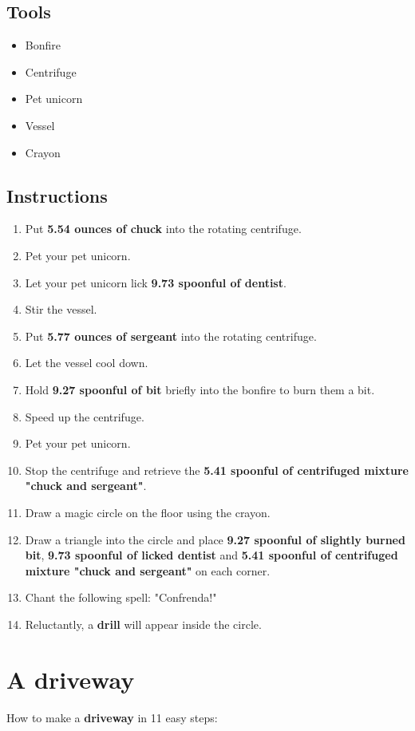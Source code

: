 \documentclass{article}
\begin{document}
\subsection{Tools}\begin{itemize}
\item 
Bonfire
\item 
Centrifuge
\item 
Pet unicorn
\item 
Vessel
\item 
Crayon
\end{itemize}
\subsection{Instructions}\begin{enumerate}
\item 
Put \textbf{5.54 ounces of chuck} into the rotating centrifuge.
\item 
Pet your pet unicorn.
\item 
Let your pet unicorn lick \textbf{9.73 spoonful of dentist}.
\item 
Stir the vessel.
\item 
Put \textbf{5.77 ounces of sergeant} into the rotating centrifuge.
\item 
Let the vessel cool down.
\item 
Hold \textbf{9.27 spoonful of bit} briefly into the bonfire to burn them a bit.
\item 
Speed up the centrifuge.
\item 
Pet your pet unicorn.
\item 
Stop the centrifuge and retrieve the \textbf{5.41 spoonful of centrifuged mixture "chuck and sergeant"}.
\item 
Draw a magic circle on the floor using the crayon.
\item 
Draw a triangle into the circle and place \textbf{9.27 spoonful of slightly burned bit}, \textbf{9.73 spoonful of licked dentist} and \textbf{5.41 spoonful of centrifuged mixture "chuck and sergeant"} on each corner.
\item 
Chant the following spell: "Confrenda!"
\item 
Reluctantly, a \textbf{drill} will appear inside the circle.
\end{enumerate}
\newpage
\section{A driveway}How to make a \textbf{driveway} in 11 easy steps:
\end{document}
